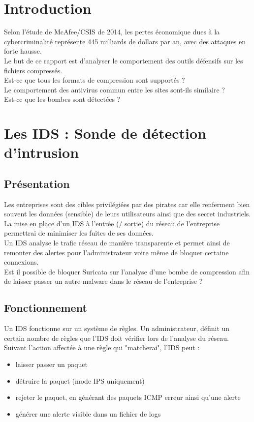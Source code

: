\documentclass[smallextended]{svjour3}       %
\begin{document}
\section{Introduction}
\label{intro}
Selon l'étude de McAfee/CSIS de 2014, les pertes économique dues à la cybercriminalité représente 445 milliards de dollars par an, avec des attaques en forte hausse.\\
Le but de ce rapport est d'analyser le comportement des outils défensifs sur les fichiers compressés.\\
Est-ce que tous les formats de compression sont supportés ?\\
Le comportement des antivirus commun entre les sites sont-ils similaire ?\\
Est-ce que les bombes sont détectées ?\\


\newpage
\section{Les IDS : Sonde de détection d'intrusion}
\label{sec1:ids}

\subsection{Présentation}
\label{ids:présentation}
Les entreprises sont des cibles privilégiées par des pirates car elle renferment bien souvent les données (sensible) de leurs utilisateurs ainsi que des secret industriels. La mise en place d'un IDS à l'entrée (/ sortie) du réseau de l'entreprise permettrai de minimiser les fuites de ses données.\\
Un IDS analyse le trafic réseau de manière transparente et permet ainsi de remonter des alertes pour l'administrateur voire même de bloquer certaine connexions.\\
Est il possible de bloquer Suricata \cite{Suricata} sur l'analyse d'une bombe de compression afin de laisser passer un autre malware dans le réseau de l'entreprise ?

\subsection{Fonctionnement}
\label{ids:fonctionnement}
Un IDS fonctionne sur un système de règles. Un administrateur, définit un certain nombre de règles que l'IDS doit vérifier lors de l'analyse du réseau. Suivant l'action affectée à une règle qui "matcherai", l'IDS peut :
\begin{itemize}
\item laisser passer un paquet
\item détruire la paquet (mode IPS uniquement)
\item rejeter le paquet, en générant des paquets ICMP erreur ainsi qu'une alerte
\item générer une alerte visible dans un fichier de logs
\end{itemize}
\end{document}
